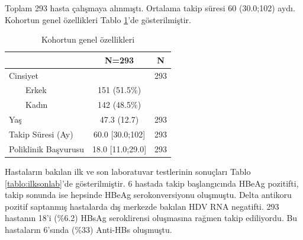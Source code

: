 Toplam 293 hasta çalışmaya alınmıştı. Ortalama takip süresi 60 (30.0;102) aydı. Kohortun genel özellikleri Tablo \ref{tablo:kohortgenel}'de gösterilmiştir. 

 \begin{longtable}{lcc}\caption{Kohortun genel özellikleri}\label{tablo:kohortgenel}\\
    \hline
     &    N=293       &  N \\
     \hline
    Cinsiyet &                  & 293\\
$\qquad$Erkek &   151 (51.5\%)    &    \\
$\qquad$Kadın &   142 (48.5\%)    &    \\
Yaş &   47.3 (12.7)    & 293\\
Takip Süresi (Ay) & 60.0 [30.0;102]  & 293\\
Poliklinik Başvurusu & 18.0 [11.0;29.0] & 293 \\

    \hline
    \end{longtable}

Hastaların bakılan ilk ve son laboratuvar testlerinin sonuçları Tablo \ref{tablo:ilksonlab}'de gösterilmiştir. 6 hastada takip başlangıcında HBeAg pozitifti, takip sonunda ise hepsinde HBeAg serokonversiyonu oluşmuştu. Delta antikoru pozitif saptanmış hastalarda dış merkezde bakılan HDV RNA negatifti. 293 hastanın 18'i (\%6.2) HBsAg seroklirensi oluşmasına rağmen takip ediliyordu. Bu hastaların 6'sında (\%33) Anti-HBs oluşmuştu.   


